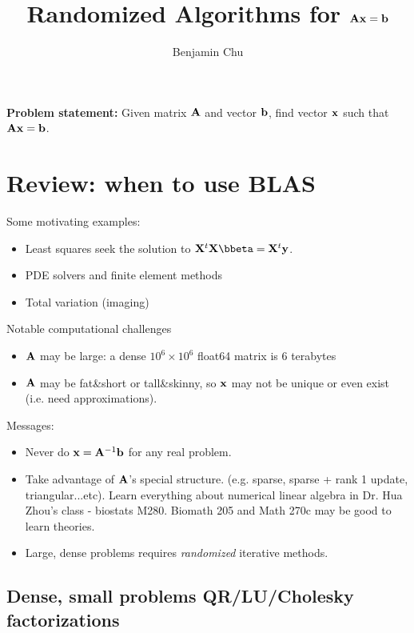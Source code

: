 \documentclass[./some_latex_template.tex]{subfiles}
\begin{document}
\title{Randomized Algorithms for $\mathbf{A}\mathbf{x} = \mathbf{b}$}
\author{Benjamin Chu}
\maketitle

\textbf{Problem statement:} Given matrix $\mathbf{A}$ and vector $\mathbf{b}$, find vector $\mathbf{x}$ such that $\mathbf{A} \mathbf{x} = \mathbf{b}$.

\section{Review: when to use BLAS}

\noindent Some motivating examples:

\begin{itemize}
	\item Least squares seek the solution to $\bX^t\bX \bbeta = \bX^t \by$. 
	\item PDE solvers and finite element methods
	\item Total variation (imaging)
\end{itemize}

\noindent Notable computational challenges

\begin{itemize}
	\item $\mathbf{A}$ may be large: a dense $10^6 \times 10^6$ float64 matrix is 6 terabytes
	\item $\mathbf{A}$ may be fat\&short or tall\&skinny, so $\mathbf{x}$ may not be unique or even exist (i.e. need approximations). 
\end{itemize}

\noindent Messages:
 
\begin{itemize}
	\item Never do $\mathbf{x} = \mathbf{A}^{-1}\mathbf{b}$ for any real problem.
	\item Take advantage of $\mathbf{A}$'s special structure. (e.g. sparse, sparse + rank 1 update, triangular...etc). Learn everything about numerical linear algebra in Dr. Hua Zhou's class -  biostats M280. Biomath 205 and Math 270c may be good to learn theories. 
	\item Large, dense problems requires \textit{randomized} iterative methods. 
\end{itemize}

\subsection{Dense, small problems QR/LU/Cholesky factorizations}
\end{document}
